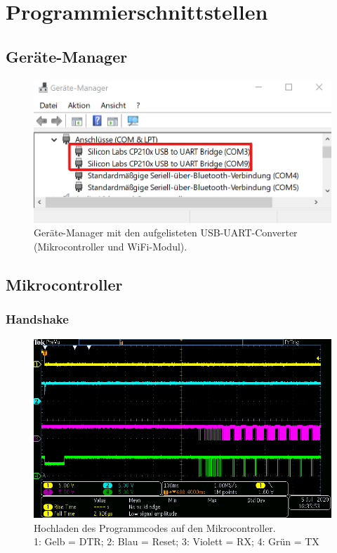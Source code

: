 
\section{Programmierschnittstellen}\label{Appendix:Programmierschnittstellen}

\subsection{Geräte-Manager}\label{Appendix:Geraete_Manager}

\begin{figure}[H]
\center
\includegraphics[width = 0.6 \textwidth]{graphics/USB_Devices_Ger_Man}
\caption{Geräte-Manager mit den aufgelisteten USB-UART-Converter (Mikrocontroller und WiFi-Modul).}
\label{fig:USB_Devices_Ger_Man}
\end{figure}

\subsection{Mikrocontroller}\label{Appendix:Handshake_uC}

\subsubsection{Handshake}\label{Appendix:Handshake_uc_Messung}
\begin{figure}[H]
\center
\includegraphics[width = \textwidth]{graphics/ATMega2560_DTR_RESET_RX_TX_gesamt}
\caption{Hochladen des Programmcodes auf den Mikrocontroller.\\\hspace{\textwidth}1: Gelb = DTR; 2: Blau = Reset; 3: Violett = RX; 4: Grün = TX}
\label{fig:ATMega2560_DTR_RESET_RX_TX_gesamt}
\end{figure}

